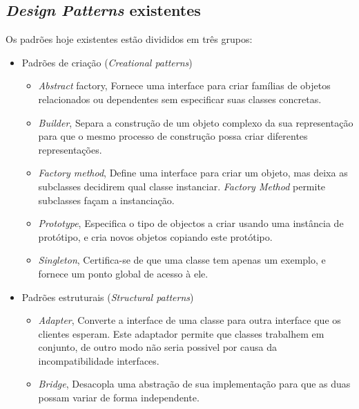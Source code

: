 \subsection{\emph{Design Patterns} existentes}
\label{sub:designexistentes}


Os padrões hoje existentes estão divididos em três grupos:\cite{gamma95}

\begin{itemize}
	\item
		Padrões de criação (\emph{Creational patterns}) \\

		\begin{itemize}
			\item 
				\emph{Abstract} factory, Fornece uma interface para criar famílias de objetos relacionados ou dependentes sem especificar suas classes concretas.\\

			\item 
				\emph{Builder}, Separa a construção de um objeto complexo da sua representação para que
o mesmo processo de construção possa criar diferentes representações.\\
			\item 
				\emph{Factory method}, Define uma interface para criar um objeto, mas deixa as subclasses decidirem qual classe instanciar. \emph{Factory Method} permite subclasses façam a instanciação.\\

			\item 
				\emph{Prototype}, Especifica o tipo de objectos a criar usando uma instância de protótipo, e cria
novos objetos copiando este protótipo.\\

			\item 
				\emph{Singleton}, Certifica-se de que uma classe tem apenas um exemplo, e fornece um ponto global de acesso à ele.\\

		\end{itemize}

	\item
		Padrões estruturais (\emph{Structural patterns})\\
		
		\begin{itemize}
			\item \emph{Adapter}, Converte a interface de uma classe para outra interface que os clientes esperam. Este adaptador permite que classes trabalhem em conjunto, de outro modo não seria possivel por causa da incompatibilidade
interfaces.  \\
			\item \emph{Bridge}, Desacopla uma abstração de sua implementação para que as duas possam variar
de forma independente.\\


\end{itemize}
\end{itemize}
